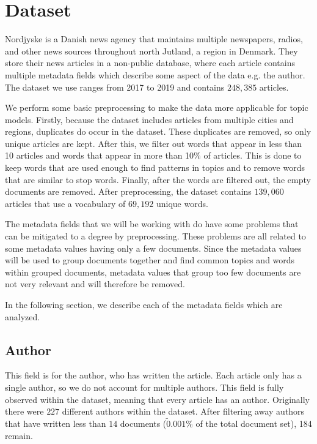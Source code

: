 \section{Dataset}\label{sec:dataset}
Nordjyske is a Danish news agency that maintains multiple newspapers, radios, and other news sources throughout north Jutland, a region in Denmark.
They store their news articles in a non-public database, where each article contains multiple metadata fields which describe some aspect of the data e.g. the author.
The dataset we use ranges from 2017 to 2019 and contains $248,385$ articles.

We perform some basic preprocessing to make the data more applicable for topic models.
Firstly, because the dataset includes articles from multiple cities and regions, duplicates do occur in the dataset.
These duplicates are removed, so only unique articles are kept.
After this, we filter out words that appear in less than 10 articles and words that appear in more than 10$\%$ of articles.
This is done to keep words that are used enough to find patterns in topics and to remove words that are similar to stop words.
Finally, after the words are filtered out, the empty documents are removed.
After preprocessing, the dataset contains $139,060$ articles that use a vocabulary of $69,192$ unique words.

The metadata fields that we will be working with do have some problems that can be mitigated to a degree by preprocessing.
These problems are all related to some metadata values having only a few documents.
Since the metadata values will be used to group documents together and find common topics and words within grouped documents, metadata values that group too few documents are not very relevant and will therefore be removed.

In the following section, we describe each of the metadata fields which are analyzed.

\subsection{Author}
This field is for the author, who has written the article.
Each article only has a single author, so we do not account for multiple authors.
This field is fully observed within the dataset, meaning that every article has an author.
Originally there were $227$ different authors within the dataset.
After filtering away authors that have written less than $14$ documents ($\tilde0.001\%$ of the total document set), 184 remain.

